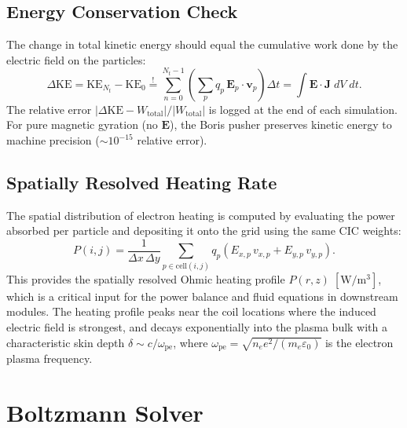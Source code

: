 \documentclass[11pt,a4paper]{report}
\newcommand{\dt}{\Delta t}
\newcommand{\dx}{\Delta x}
\newcommand{\dy}{\Delta y}
\begin{document}
\subsection{Energy Conservation Check}

The change in total kinetic energy should equal the cumulative work done by the electric field on the particles:
\begin{equation}
  \Delta \mathrm{KE} = \mathrm{KE}_{N_t} - \mathrm{KE}_0
  \stackrel{!}{=} \sum_{n=0}^{N_t - 1} \left(\sum_p q_p\,\mathbf{E}_p \cdot \mathbf{v}_p\right) \dt
  = \int \mathbf{E} \cdot \mathbf{J}\;dV\;dt.
  \label{eq:m08-energy-conservation}
\end{equation}
The relative error $|\Delta\mathrm{KE} - W_\mathrm{total}| / |W_\mathrm{total}|$ is logged at the end of each simulation.  For pure magnetic gyration (no $\mathbf{E}$), the Boris pusher preserves kinetic energy to machine precision ($\sim 10^{-15}$ relative error).

\subsection{Spatially Resolved Heating Rate}

The spatial distribution of electron heating is computed by evaluating the power absorbed per particle and depositing it onto the grid using the same CIC weights:
\begin{equation}
  P(i,j) = \frac{1}{\dx\,\dy} \sum_{p \in \mathrm{cell}(i,j)}
    q_p\!\left(E_{x,p}\,v_{x,p} + E_{y,p}\,v_{y,p}\right).
  \label{eq:m08-heating}
\end{equation}
This provides the spatially resolved Ohmic heating profile $P(r,z)\;[\si{\watt\per\meter\cubed}]$, which is a critical input for the power balance and fluid equations in downstream modules.  The heating profile peaks near the coil locations where the induced electric field is strongest, and decays exponentially into the plasma bulk with a characteristic skin depth $\delta \sim c/\omega_\mathrm{pe}$, where $\omega_\mathrm{pe} = \sqrt{n_e e^2/(m_e \varepsilon_0)}$ is the electron plasma frequency.


\section{Boltzmann Solver}
\label{sec:m09}
\end{document}
